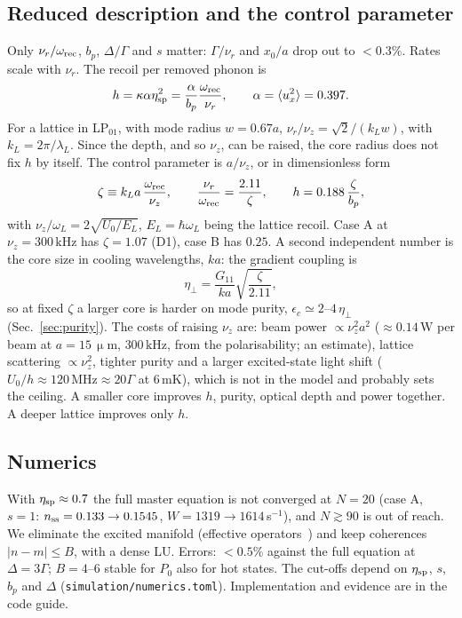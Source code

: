 \documentclass[11pt,a4paper]{article}
\newcommand{\micrometre}{\upmu m}\newcommand{\microkelvin}{\upmu K}
\newcommand{\SI}[2]{\ensuremath{#1\,\mathrm{#2}}}
\newcommand{\etaeff}{\eta_{\perp}}
\begin{document}
\subsection{Reduced description and the control parameter}
\label{sec:zeta}\hypertarget{d:zeta}{}
Only $\nu_r/\omega_{\rm rec}$, $b_p$, $\Delta/\Gamma$ and $s$ matter: $\Gamma/\nu_r$ and $x_0/a$ drop out to $<0.3\%$. Rates scale with $\nu_r$. The recoil per removed phonon is
\begin{equation}
  h=\kappa\alpha\eta_{\rm sp}^2=\frac{\alpha}{b_p}\frac{\omega_{\rm rec}}{\nu_r},\qquad \alpha=\langle u_x^2\rangle=0.397 .
\end{equation}
For a lattice in LP$_{01}$, with mode radius $w=0.67a$, $\nu_r/\nu_z=\sqrt2/(k_Lw)$, with $k_L=2\pi/\lambda_L$. Since the depth, and so $\nu_z$, can be raised, the core radius does not fix $h$ by itself. The control parameter is $a/\nu_z$, or in dimensionless form
\begin{equation}
  \zeta\equiv k_La\,\frac{\omega_{\rm rec}}{\nu_z},\qquad \frac{\nu_r}{\omega_{\rm rec}}=\frac{2.11}{\zeta},\qquad h=0.188\,\frac{\zeta}{b_p},
  \label{eq:zeta}
\end{equation}
with $\nu_z/\omega_L=2\sqrt{U_0/E_L}$, $E_L=\hbar\omega_L$ being the lattice recoil. Case A at $\nu_z=\SI{300}{kHz}$ has $\zeta=1.07$ (D1), case B has $0.25$. A second independent number is the core size in cooling wavelengths, $ka$: the gradient coupling is
\begin{equation}
  \etaeff=\frac{G_{11}}{ka}\sqrt{\frac{\zeta}{2.11}},
\end{equation}
so at fixed $\zeta$ a larger core is harder on mode purity, $\epsilon_c\simeq2$--$4\,\etaeff$ (Sec.~\ref{sec:purity}). The costs of raising $\nu_z$ are: beam power $\propto\nu_z^2a^2$ ($\approx\SI{0.14}{W}$ per beam at $a=\SI{15}{\micrometre}$, $\SI{300}{kHz}$, from the polarisability; an estimate), lattice scattering $\propto\nu_z^2$, tighter purity and a larger excited-state light shift ($U_0/h\approx\SI{120}{MHz}\approx20\Gamma$ at \SI{6}{mK}), which is not in the model and probably sets the ceiling. A smaller core improves $h$, purity, optical depth and power together. A deeper lattice improves only $h$.

\subsection{Numerics}
\hypertarget{d:numerics}{}
With $\eta_{\rm sp}\approx0.7$ the full master equation is not converged at $N=20$ (case A, $s=1$: $n_{\rm ss}=0.133\to0.1545$, $W=1319\to1614\,$s$^{-1}$), and $N\gtrsim90$ is out of reach. We eliminate the excited manifold (effective operators~\cite{reiter2012}) and keep coherences $|n-m|\le B$, with a dense LU. Errors: $<0.5\%$ against the full equation at $\Delta=3\Gamma$; $B=4$--6 stable for $P_0$ also for hot states. The cut-offs depend on $\eta_{\rm sp}$, $s$, $b_p$ and $\Delta$ (\texttt{simulation/numerics.toml}). Implementation and evidence are in the code guide.
\end{document}

